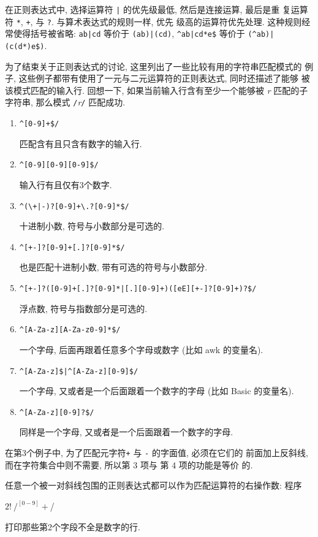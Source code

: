 在正则表达式中, 选择运算符 \verb'|' 的优先级最低, 然后是连接运算, 最后是重
复运算符 \verb'*', \verb'+', 与 \verb'?'. 与算术表达式的规则一样, 优先
级高的运算符优先处理. 这种规则经常使得括号被省略: \verb'ab|cd' 等价于
\verb'(ab)|(cd)', \verb'^ab|cd*e$' 等价于 \verb'(^ab)|(c(d*)e$)'.

为了结束关于正则表达式的讨论, 这里列出了一些比较有用的字符串匹配模式的
例子, 这些例子都带有使用了一元与二元运算符的正则表达式, 同时还描述了能够
被该模式匹配的输入行. 回想一下, 如果当前输入行含有至少一个能够被
\textit{r} 匹配的子字符串, 那么模式 \verb'/'\textit{r}\verb'/'
匹配成功.
\begin{enumerate}
\item[] \verb'^[0-9]+$/' \par
    \qquad 匹配含有且只含有数字的输入行.
\item[] \verb'^[0-9][0-9][0-9]$/' \par
    \qquad 输入行有且仅有3个数字.
\item[] \verb'^(\+|-)?[0-9]+\.?[0-9]*$/' \par
    \qquad 十进制小数, 符号与小数部分是可选的.
\item[] \verb'^[+-]?[0-9]+[.]?[0-9]*$/' \par
    \qquad 也是匹配十进制小数, 带有可选的符号与小数部分.
\item[] \verb'^[+-]?([0-9]+[.]?[0-9]*|[.][0-9]+)([eE][+-]?[0-9]+)?$/' \par
    \qquad 浮点数, 符号与指数部分是可选的.
\item[] \verb'^[A-Za-z][A-Za-z0-9]*$/' \par
    \qquad 一个字母, 后面再跟着任意多个字母或数字 (比如 awk 的变量名).
\item[] \verb'^[A-Za-z]$|^[A-Za-z][0-9]$/' \par
    \qquad 一个字母, 又或者是一个后面跟着一个数字的字母 (比如 Basic 的变量名).
\item[] \verb'^[A-Za-z][0-9]?$/' \par
    \qquad 同样是一个字母, 又或者是一个后面跟着一个数字的字母.
\end{enumerate}
在第3个例子中, 为了匹配元字符\verb'+' 与 \verb'-' 的字面值, 必须在它们的
前面加上反斜线, 而在字符集合中则不需要, 所以第 3 项与 第 4 项的功能是等价
的.

任意一个被一对斜线包围的正则表达式都可以作为匹配运算符的右操作数: 程序
\begin{awkcode}
    $2 !~ /^[0-9]+$/
\end{awkcode}
打印那些第2个字段不全是数字的行.

